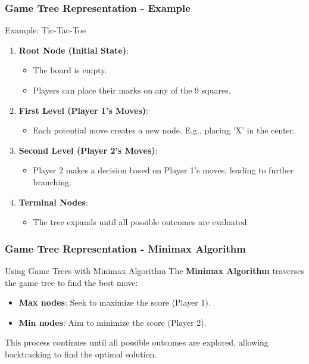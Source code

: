 \documentclass[aspectratio=169]{beamer}
\begin{document}
\begin{frame}[fragile]
    \frametitle{Game Tree Representation - Example}
    \begin{block}{Example: Tic-Tac-Toe}
        \begin{enumerate}
            \item \textbf{Root Node (Initial State)}:
                \begin{itemize}
                    \item The board is empty.
                    \item Players can place their marks on any of the 9 squares.
                \end{itemize}
            \item \textbf{First Level (Player 1's Moves)}:
                \begin{itemize}
                    \item Each potential move creates a new node. E.g., placing 'X' in the center.
                \end{itemize}
            \item \textbf{Second Level (Player 2's Moves)}:
                \begin{itemize}
                    \item Player 2 makes a decision based on Player 1's moves, leading to further branching.
                \end{itemize}
            \item \textbf{Terminal Nodes}:
                \begin{itemize}
                    \item The tree expands until all possible outcomes are evaluated.
                \end{itemize}
        \end{enumerate}
    \end{block}
\end{frame}

\begin{frame}[fragile]
    \frametitle{Game Tree Representation - Minimax Algorithm}
    \begin{block}{Using Game Trees with Minimax Algorithm}
        The \textbf{Minimax Algorithm} traverses the game tree to find the best move:
        \begin{itemize}
            \item \textbf{Max nodes}: Seek to maximize the score (Player 1).
            \item \textbf{Min nodes}: Aim to minimize the score (Player 2).
        \end{itemize}
        This process continues until all possible outcomes are explored, allowing backtracking to find the optimal solution.
    \end{block}
\end{frame}
\end{document}
